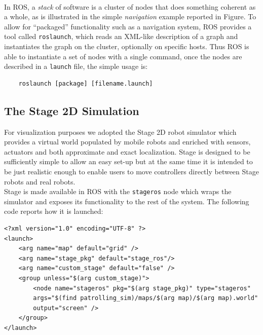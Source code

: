\\
In ROS, a \textit{stack} of software is a cluster of nodes that does something
coherent as a whole, as is illustrated in the simple \textit{navigation} example reported
in Figure. %
To allow for “packaged” functionality such as a navigation system, ROS provides
a tool called \texttt{roslaunch}, which reads an XML-like description of a graph and instantiates
the graph on the cluster, optionally on specific hosts.
Thus ROS is able to instantiate a set of nodes with a single
command, once the nodes are described in a \texttt{launch} file, the simple usage
is:
\begin{lstlisting}
    roslaunch [package] [filename.launch]
\end{lstlisting}

\subsection{The Stage 2D Simulation}
For visualization purposes we adopted the Stage 2D robot simulator
which provides a virtual world populated by mobile robots and enriched with
sensors, actuators and both approximate and exact localization. Stage is
designed to be sufficiently simple to allow an easy set-up but at the same time
it is intended to be just realistic enough to enable users to move controllers
directly between Stage robots and real robots. 
\\
Stage is made available in ROS with the \texttt{stageros} node which wraps the 
simulator and exposes its functionality to the rest of the system. The following 
code reports how it is launched:

\begin{lstlisting}
<?xml version="1.0" encoding="UTF-8" ?>
<launch>
    <arg name="map" default="grid" />
    <arg name="stage_pkg" default="stage_ros"/>     
    <arg name="custom_stage" default="false" />
    <group unless="$(arg custom_stage)"> 
        <node name="stageros" pkg="$(arg stage_pkg)" type="stageros" 
        args="$(find patrolling_sim)/maps/$(arg map)/$(arg map).world" 
        output="screen" />
    </group>
</launch>
\end{lstlisting}

